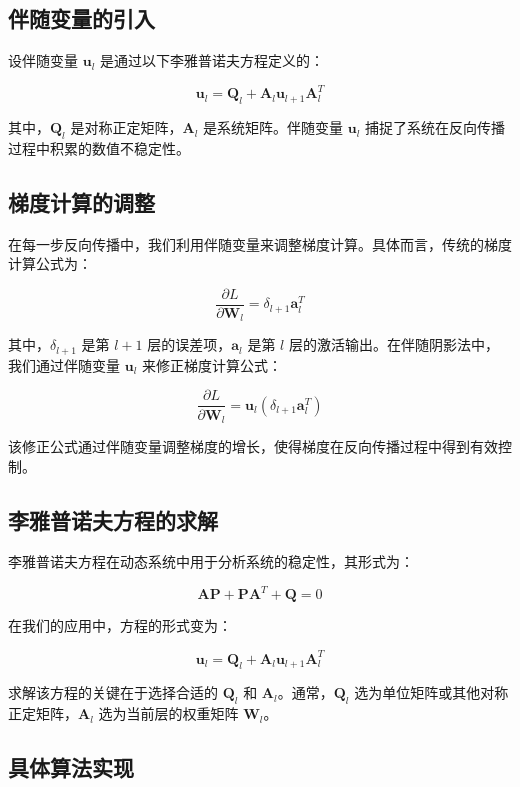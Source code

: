 \subsection{伴随变量的引入}

设伴随变量 \( \mathbf{u}_l \) 是通过以下李雅普诺夫方程定义的：

\[ \mathbf{u}_l = \mathbf{Q}_l + \mathbf{A}_l \mathbf{u}_{l+1} \mathbf{A}_l^T \]

其中，\( \mathbf{Q}_l \) 是对称正定矩阵，\( \mathbf{A}_l \) 是系统矩阵。伴随变量 \( \mathbf{u}_l \) 捕捉了系统在反向传播过程中积累的数值不稳定性。

\subsection{梯度计算的调整}

在每一步反向传播中，我们利用伴随变量来调整梯度计算。具体而言，传统的梯度计算公式为：

\[ \frac{\partial L}{\partial \mathbf{W}_l} = \delta_{l+1} \mathbf{a}_l^T \]

其中，\( \delta_{l+1} \) 是第 \( l+1 \) 层的误差项，\( \mathbf{a}_l \) 是第 \( l \) 层的激活输出。在伴随阴影法中，我们通过伴随变量 \( \mathbf{u}_l \) 来修正梯度计算公式：

\[ \frac{\partial L}{\partial \mathbf{W}_l} = \mathbf{u}_l (\delta_{l+1} \mathbf{a}_l^T) \]

该修正公式通过伴随变量调整梯度的增长，使得梯度在反向传播过程中得到有效控制。

\subsection{李雅普诺夫方程的求解}

李雅普诺夫方程在动态系统中用于分析系统的稳定性，其形式为：

\[ \mathbf{A} \mathbf{P} + \mathbf{P} \mathbf{A}^T + \mathbf{Q} = 0 \]

在我们的应用中，方程的形式变为：

\[ \mathbf{u}_l = \mathbf{Q}_l + \mathbf{A}_l \mathbf{u}_{l+1} \mathbf{A}_l^T \]

求解该方程的关键在于选择合适的 \( \mathbf{Q}_l \) 和 \( \mathbf{A}_l \)。通常，\( \mathbf{Q}_l \) 选为单位矩阵或其他对称正定矩阵，\( \mathbf{A}_l \) 选为当前层的权重矩阵 \( \mathbf{W}_l \)。

\subsection{具体算法实现}

